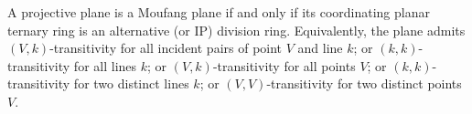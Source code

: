 A projective plane is a Moufang plane if and only if its coordinating planar ternary ring is an alternative (or IP) division ring. Equivalently, the plane admits $(V,k)$-transitivity for all incident pairs of point $V$ and line $k$; or $(k,k)$-transitivity for all lines $k$; or $(V,k)$-transitivity for all points $V$; or $(k,k)$-transitivity for two distinct lines $k$; or $(V,V)$-transitivity for two distinct points $V$.
